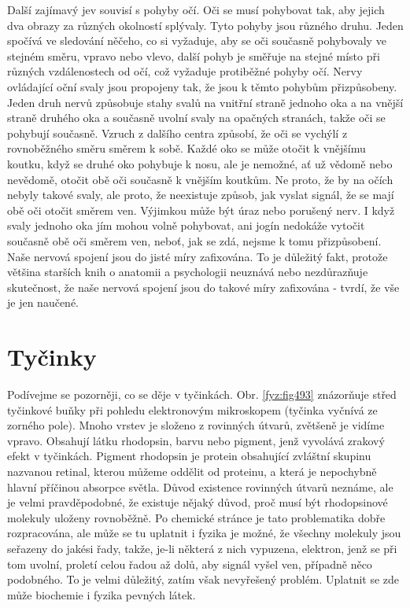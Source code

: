     Další zajímavý jev souvisí s pohyby očí. Oči se musí pohybovat tak, aby jejich dva obrazy za
    různých okolností splývaly. Tyto pohyby jsou různého druhu. Jeden spočívá ve sledování něčeho,
    co si vyžaduje, aby se oči současně pohybovaly ve stejném směru, vpravo nebo vlevo, další pohyb
    je směřuje na stejné místo při různých vzdálenostech od očí, což vyžaduje protiběžné pohyby očí.
    Nervy ovládající oční svaly jsou propojeny tak, že jsou k těmto pohybům přizpůsobeny. Jeden druh
    nervů způsobuje stahy svalů na vnitřní straně jednoho oka a na vnější straně druhého oka a
    současně uvolní svaly na opačných stranách, takže oči se pohybují současně. Vzruch z dalšího
    centra způsobí, že oči se vychýlí z rovnoběžného směru směrem k sobě. Každé oko se může otočit k
    vnějšímu koutku, když se druhé oko pohybuje k nosu, ale je nemožné, ať už vědomě nebo nevědomě,
    otočit obě oči současně k vnějším koutkům. Ne proto, že by na očích nebyly takové svaly, ale
    proto, že neexistuje způsob, jak vyslat signál, že se mají obě oči otočit směrem ven. Výjimkou
    může být úraz nebo porušený nerv. I když svaly jednoho oka jím mohou volně pohybovat, ani jogín
    nedokáže vytočit současně obě oči směrem ven, neboť, jak se zdá, nejsme k tomu přizpůsobení.
    Naše nervová spojení jsou do jisté míry zafixována. To je důležitý fakt, protože většina starších
    knih o anatomii a psychologii neuznává nebo nezdůrazňuje skutečnost, že naše nervová spojení
    jsou do takové míry zafixována - tvrdí, že vše je jen naučené.

  \section{Tyčinky}\label{fyz:IchapXXXVIsecIII}
    Podívejme se pozorněji, co se děje v tyčinkách. Obr. \ref{fyz:fig493} znázorňuje střed tyčinkové
    buňky při pohledu elektronovým mikroskopem (tyčinka vyčnívá ze zorného pole). Mnoho vrstev je
    složeno z rovinných útvarů, zvětšeně je vidíme vpravo. Obsahují látku rhodopsin, barvu nebo
    pigment, jenž vyvolává zrakový efekt v tyčinkách. Pigment rhodopsin je protein obsahující
    zvláštní skupinu  nazvanou retinal, kterou můžeme oddělit od proteinu, a která je nepochybně
    hlavní příčinou absorpce světla. Důvod existence rovinných útvarů neznáme, ale je velmi
    pravděpodobné, že existuje nějaký důvod, proč musí být rhodopsinové molekuly uloženy rovnoběžně.
    Po chemické stránce je tato problematika dobře rozpracována, ale může se tu uplatnit i fyzika je
    možné, že všechny molekuly jsou seřazeny do jakési řady, takže, je-li některá z nich vypuzena,
    elektron, jenž se při tom uvolní, proletí celou řadou až dolů, aby signál vyšel ven, případně
    něco podobného. To je velmi důležitý, zatím však nevyřešený problém. Uplatnit se zde může
    biochemie i fyzika pevných látek.

